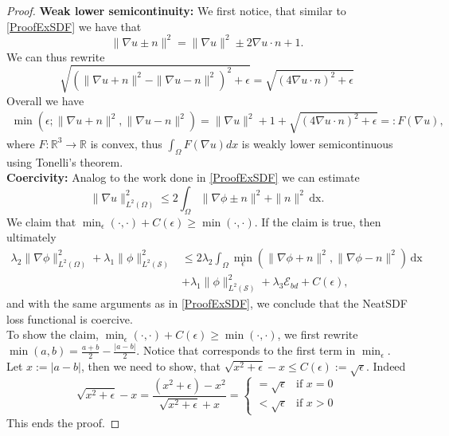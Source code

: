 \documentclass[draft,12pt,openany]{book}
\newcommand{\R}{\mathbb{R}}
\def\S{\mathcal{S}}
\theoremstyle{plainnormal}
\theoremstyle{remark}
\begin{document}
\begin{proof}
\textbf{Weak lower semicontinuity:} We first notice, that similar to \cref{ProofExSDF} we have that $$\|\nabla u \pm n\|^2 = \|\nabla u\|^2 \pm 2 \nabla u \cdot n + 1.$$
    We can thus rewrite $$\sqrt{(\|\nabla u + n\|^2 - \|\nabla u - n\|^2)^2 + \epsilon} = \sqrt{(4 \nabla u\cdot n)^2 + \epsilon}$$
    Overall we have \begin{align*}
        \min (\epsilon; \|\nabla u+ n\|^2,\|\nabla u - n\|^2) = \|\nabla u\|^2 + 1 + \sqrt{(4 \nabla u\cdot n)^2 + \epsilon}=: F(\nabla u), 
    \end{align*}
    where $F :\R^3 \rightarrow\R
    $ is convex, thus $\int_\Omega F(\nabla u) dx$ is weakly lower semicontinuous using Tonelli's theorem.\\
    \textbf{Coercivity:} Analog to the work done in \cref{ProofExSDF} we can estimate $$\|\nabla u\|^2_{L^2(\Omega)} \leq 2 \int_\Omega \|\nabla \phi \pm n\|^2 + \|n\|^2\,\mathrm{dx}.$$
    We claim that $\min_\epsilon(\cdot, \cdot) + C(\epsilon) \geq \min(\cdot, \cdot)$. If the claim is true, then ultimately 
    \begin{align*}
    \lambda_2\|\nabla \phi\| ^2_{L^2(\Omega)} + \lambda_1 \|\phi\| ^2_{L^2(\S)}
 &\leq 2 \lambda_2\int_\Omega\min_\epsilon(\|\nabla \phi + n\|^2, \|\nabla \phi - n\|^2) \,\mathrm{dx} \\ 
 &+ \lambda_1 \|\phi\| ^2_{L^2(\S)} + \lambda_3 \mathcal{E}_{bd} + C(\epsilon),
\end{align*} 
and with the same arguments as in \cref{ProofExSDF}, we conclude that the NeatSDF loss functional is coercive.\\
To show the claim, $\min_\epsilon(\cdot, \cdot) + C(\epsilon) \geq \min(\cdot, \cdot)$, we first rewrite $\min(a,b) = \frac{a+b}{2} - \frac{|a-b|}{2}$. Notice that corresponds to the first term in $\min_\epsilon$. Let $x := |a-b|$, then we need to show, that $\sqrt{x^2 + \epsilon } -x \leq C(\epsilon) := \sqrt{\epsilon}$.
Indeed $$\sqrt{x^2 + \epsilon } -x = \frac{(x^2+\epsilon) - x^2}{\sqrt{x^2+\epsilon} + x} = 
\begin{cases}
= \sqrt{\epsilon} & \text{if } x = 0 \\
< \sqrt{\epsilon} & \text{if } x > 0
\end{cases}$$
This ends the proof.
\end{proof}
\clearpage
\end{document}
